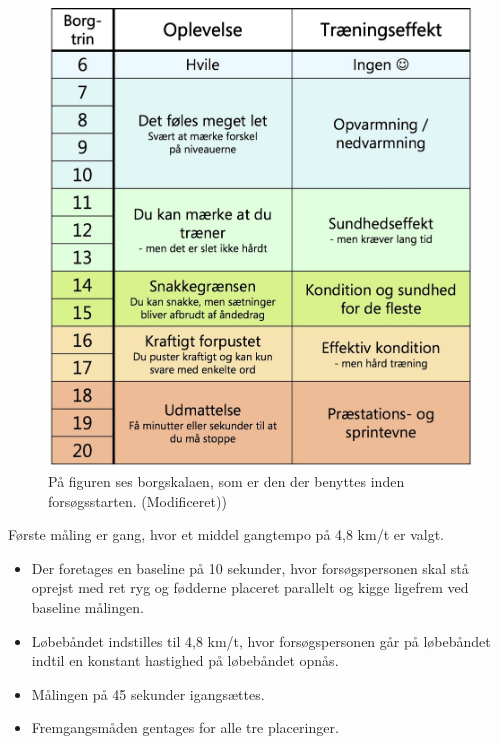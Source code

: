 \begin{figure}[H]
	\centering
	\includegraphics[scale=0.5]{figures/qBilag/Borg-skala.jpg}
	\caption{På figuren ses borgskalaen, som er den der benyttes inden forsøgsstarten. (Modificeret)\cite{Patientinformationen2013})}
	\label{fig:borgskala}
\end{figure}

Første måling er gang, hvor et middel gangtempo på 4,8 km/t er valgt\citep{Miles2007}. \vspace{-3mm}
\begin{itemize}
		\item Der foretages en baseline på 10 sekunder, hvor forsøgspersonen skal stå oprejst med ret ryg og fødderne placeret parallelt og kigge ligefrem ved baseline målingen.
		\item Løbebåndet indstilles til 4,8 km/t, hvor forsøgspersonen går på løbebåndet indtil en konstant hastighed på løbebåndet opnås. 
		\item Målingen på 45 sekunder igangsættes.
		\item Fremgangsmåden gentages for alle tre placeringer. 
\end{itemize}
 
